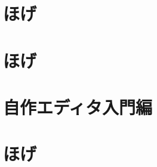 \documentclass[autodetect-engine,dvipdfmx-if-dvi,ja=standard,a4paper,12pt,twoside,openany,layout=v2]{bxjsbook}
\begin{document}
\chapter{ほげ}


\chapter{ほげ}


\chapter{自作エディタ入門編}


\chapter{ほげ}


\newpage
\myimpression
\end{document}
